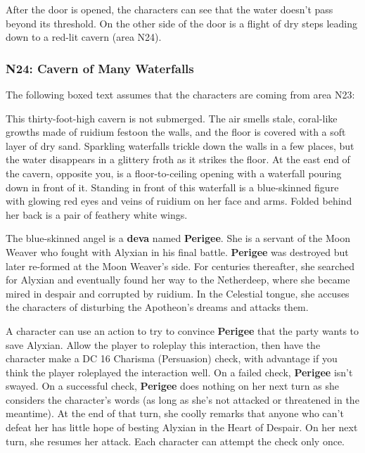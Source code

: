 \documentclass[letterpaper, 11pt, bg=full, twocolumn]{dndbook}
\begin{document}
After the door is opened, the characters can see that the water doesn't pass beyond its threshold. On the other side of the door is a flight of dry steps leading down to a red-lit cavern (area N24).

\subsubsection{N24: Cavern of Many Waterfalls}

The following boxed text assumes that the characters are coming from area N23:

\begin{DndReadAloud}
This thirty-foot-high cavern is not submerged. The air smells stale, coral-like growths made of ruidium festoon the walls, and the floor is covered with a soft layer of dry sand. Sparkling waterfalls trickle down the walls in a few places, but the water disappears in a glittery froth as it strikes the floor.
At the east end of the cavern, opposite you, is a floor-to-ceiling opening with a waterfall pouring down in front of it. Standing in front of this waterfall is a blue-skinned figure with glowing red eyes and veins of ruidium on her face and arms. Folded behind her back is a pair of feathery white wings.
\end{DndReadAloud}

The blue-skinned angel is a \textbf{deva} named \textbf{Perigee}. She is a servant of the Moon Weaver who fought with Alyxian in his final battle. \textbf{Perigee} was destroyed but later re-formed at the Moon Weaver's side. For centuries thereafter, she searched for Alyxian and eventually found her way to the Netherdeep, where she became mired in despair and corrupted by ruidium. In the Celestial tongue, she accuses the characters of disturbing the Apotheon's dreams and attacks them.


A character can use an action to try to convince \textbf{Perigee} that the party wants to save Alyxian. Allow the player to roleplay this interaction, then have the character make a DC 16 Charisma (Persuasion) check, with advantage if you think the player roleplayed the interaction well. On a failed check, \textbf{Perigee} isn't swayed. On a successful check, \textbf{Perigee} does nothing on her next turn as she considers the character's words (as long as she's not attacked or threatened in the meantime). At the end of that turn, she coolly remarks that anyone who can't defeat her has little hope of besting Alyxian in the Heart of Despair. On her next turn, she resumes her attack. Each character can attempt the check only once.
\end{document}
